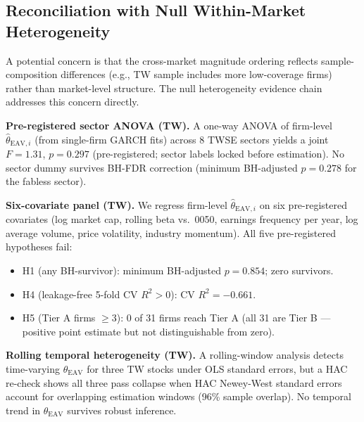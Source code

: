 \documentclass[12pt,a4paper]{article}
\begin{document}
\subsection{Reconciliation with Null Within-Market Heterogeneity}
\label{sec:nullhet}

A potential concern is that the cross-market magnitude ordering reflects
sample-composition differences (e.g., TW sample includes more
low-coverage firms) rather than market-level structure. The null
heterogeneity evidence chain addresses this concern directly.

\textbf{Pre-registered sector ANOVA (TW).} A one-way ANOVA of
firm-level $\hat{\theta}_{\mathrm{EAV},i}$ (from single-firm GARCH fits)
across 8 TWSE sectors yields a joint $F = 1.31$, $p = 0.297$
(pre-registered; sector labels locked before estimation).
No sector dummy survives BH-FDR correction (minimum BH-adjusted
$p = 0.278$ for the fabless sector).

\textbf{Six-covariate panel (TW).} We regress firm-level
$\hat{\theta}_{\mathrm{EAV},i}$ on six pre-registered covariates
(log market cap, rolling beta vs.\ 0050, earnings frequency per year,
log average volume, price volatility, industry momentum). All five
pre-registered hypotheses fail:
\begin{itemize}
\item H1 (any BH-survivor): minimum BH-adjusted $p = 0.854$; zero survivors.
\item H4 (leakage-free 5-fold CV $R^2 > 0$): CV $R^2 = -0.661$.
\item H5 (Tier A firms $\geq 3$): 0 of 31 firms reach Tier A (all 31
  are Tier B — positive point estimate but not distinguishable from zero).
\end{itemize}

\textbf{Rolling temporal heterogeneity (TW).} A rolling-window analysis
detects time-varying $\hat{\theta}_{\mathrm{EAV}}$ for three TW stocks
under OLS standard errors, but a HAC re-check shows all three pass collapse when
HAC Newey-West standard errors account for overlapping estimation windows
(96\% sample overlap). No temporal trend in $\hat{\theta}_{\mathrm{EAV}}$
survives robust inference.
\end{document}
